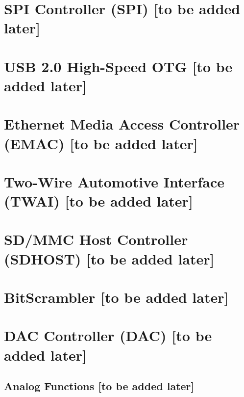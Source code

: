 \documentclass{article}
\begin{document}
\section{SPI Controller (SPI) [to be added later]}\label{mod:spi}
\section{USB 2.0 High-Speed OTG [to be added later]}\label{mod:usbotghs}
\section{Ethernet Media Access Controller (EMAC) [to be added later]}\label{mod:ethernetmac}
\section{Two-Wire Automotive Interface (TWAI) [to be added later]}\label{mod:twai}
\section{SD/MMC Host Controller (SDHOST) [to be added later]}\label{mod:sdhost}
\section{BitScrambler [to be added later]}\label{mod:bitscrm}
\section{DAC Controller (DAC) [to be added later]}\label{mod:dac}


\label{regdesc:HPSYSCLKRSTCRYPTOCTRL0REG}
\label{fielddesc:HPSYSCLKRSTREGCRYPTORSACLKEN}
\label{fielddesc:HPSYSCLKRSTREGCRYPTORSARSTEN}

\label{fielddesc:HPSYSCLKRSTAHBPDMASYSCLKEN}
\label{fielddesc:HPSYSCLKRSTRSTENAHBPDMA}
\label{fielddesc:HPSYSCLKRSTJPEGSYSCLKEN}\label{fielddesc:HPSYSCLKRSTRSTENJPEG}


\label{fig:riscvcpu-dbg-sys-overview}
\label{regdesc:LPSYSREGLPCOREBOOTADDRREG}
\label{regdesc:LPINTRSTATUSREG}

\label{fielddesc:PMUHPTRIGGERLP}
\label{fielddesc:PMULPCPUWAKEUPEN}
\label{fielddesc:PMULPCPUSLEEPREQ}
\label{fielddesc:PMULPCPUSLPSTALLEN}
\label{fielddesc:PMULPCPUSLPBYPASSINTREN}
\label{fielddesc:PMULPCPUSLPSTALLWAIT}
\label{fielddesc:PMULPCPUSLPRESETEN}
\label{fielddesc:PMUSLPREJECTEN}
\label{fielddesc:PMUSLEEPREJECTENA}

\label{fielddesc:MCONTROLACTION}
\label{regdesc:MCONTROL}

\label{fielddesc:FASTCLKSEL}
\label{fielddesc:REGLPTSENSCLKEN}

\subsection{Analog Functions [to be added later]}\label{subsec:analog_func_config}
\end{document}
